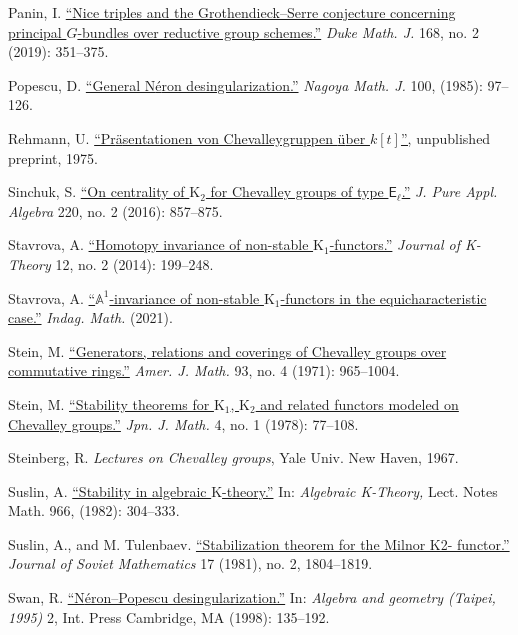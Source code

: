 \documentclass[oneside, 11pt]{amsart}
\numberwithin{equation}{section}
\newcommand{\K}{{\mathrm{K}}}
\theoremstyle{definition}
\theoremstyle{definition}
\theoremstyle{remark}
\begin{document}
\begin{thebibliography}{0}
Panin, I.
\href{http://dx.doi.org/10.1215/00127094-2018-0042}{``Nice triples and the Grothendieck–Serre conjecture concerning principal $G$-bundles over reductive group schemes.''}
\textit{Duke Math. J.} 168, no. 2 (2019): 351--375.

Popescu, D.
\href{http://dx.doi.org/10.1017/S0027763000000246}{``General N{\'e}ron desingularization.''}
\textit{Nagoya Math. J.} 100, (1985): {97--126}.


Rehmann, U.
\href{http://www.math.uni-bielefeld.de/~rehmann/Publ/praesentation.pdf}{``Pr{\"a}sentationen von Chevalleygruppen {\"u}ber $k[t]$'',} unpublished preprint, 1975.

Sinchuk, S.
\href{http://dx.doi.org/10.1016/j.jpaa.2015.08.003}{``On centrality of $\K_2$ for {C}hevalley groups of type $\mathsf{E}_\ell$.''}
\textit{J. Pure Appl. Algebra} 220, no. 2 (2016): 857--875.

Stavrova, A.
\href{http://dx.doi.org/10.1017/is013006012jkt232}{``Homotopy invariance of non-stable $\K_1$-functors.''}
\textit{Journal of K-Theory} 12, no. 2 (2014): 199--248.
  
Stavrova, A.
\href{http://dx.doi.org/10.1016/j.indag.2021.08.002}{``$\mathbb A^1$-invariance of non-stable $\K_1$-functors in the equicharacteristic case.''}
\textit{Indag. Math.} (2021).

Stein, M.
\href{http://dx.doi.org/10.2307/2373742}{``Generators, relations and coverings of Chevalley groups over commutative rings.''}
\textit{Amer. J. Math.} 93, no. 4 (1971): {965--1004}.
  
Stein, M.
\href{http://dx.doi.org/10.4099/math1924.4.77}{``Stability theorems for $\K_1$, $\K_2$ and related functors modeled on Chevalley groups.''}
\textit{Jpn. J. Math.} 4, no. 1 (1978): 77--108.  

Steinberg, R. \textit{Lectures on Chevalley groups}, Yale Univ. New Haven, 1967.

Suslin, A.
\href{http://dx.doi.org/10.1007/BFb0062181}{``Stability in algebraic $\K$-theory.''}
In: \textit{Algebraic K-Theory,} Lect. Notes Math. 966, (1982): {304--333}.

Suslin, A., and M. Tulenbaev.
\href{https://dx.doi.org/10.1007/BF01091768}{``Stabilization theorem for the Milnor K2-
functor.''} \textit{Journal of Soviet Mathematics} 17 (1981), no. 2, {1804--1819}.

Swan, R.
\href{http://hlombardi.free.fr/Swan-NeronPopescu.pdf}{``N{\'e}ron--Popescu desingularization.''}
In: \textit{Algebra and geometry (Taipei, 1995)} 2, Int. Press Cambridge, MA (1998): 135--192.


\end{thebibliography}
\end{document}
